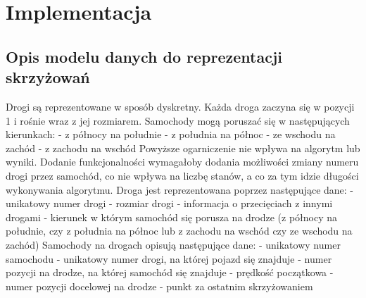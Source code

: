 \chapter{Implementacja} \label{chap:implementation}

\section{Opis modelu danych do reprezentacji skrzyżowań}

Drogi są reprezentowane w sposób dyskretny. Każda droga zaczyna się w pozycji 1 i rośnie wraz z jej rozmiarem. 
\newline
\newline
Samochody mogą poruszać się w następujących kierunkach:
\newline
- z północy na południe
\newline
- z południa na północ
\newline
- ze wschodu na zachód
\newline
- z zachodu na wschód
\newline
\newline
Powyższe ogarniczenie nie wpływa na algorytm lub wyniki. Dodanie funkcjonalności wymagałoby dodania możliwości zmiany numeru drogi przez samochód, co nie wpływa na liczbę stanów, a co za tym idzie długości wykonywania algorytmu.
\newline
\newline
Droga jest reprezentowana poprzez następujące dane:
\newline
- unikatowy numer drogi
\newline
- rozmiar drogi
\newline
- informacja o przecięciach z innymi drogami
\newline
- kierunek w którym samochód się porusza na drodze (z północy na południe, czy z południa na północ lub z zachodu na wschód czy ze wschodu na zachód)
\newline
\newline
Samochody na drogach opisują następujące dane:
\newline
- unikatowy numer samochodu
\newline
- unikatowy numer drogi, na której pojazd się znajduje
\newline
- numer pozycji na drodze, na której samochód się znajduje
\newline
- prędkość początkowa
\newline
- numer pozycji docelowej na drodze - punkt za ostatnim skrzyżowaniem
\newline
